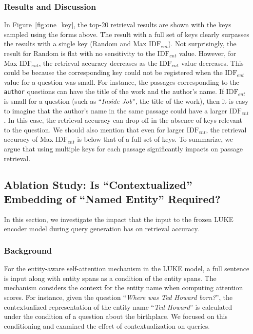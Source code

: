 \documentclass[letterpaper]{article} \usepackage{aaai23}  \usepackage{times}  \usepackage{helvet}  \usepackage{courier}  \usepackage[hyphens]{url}  \usepackage{graphicx} \urlstyle{rm} \def\UrlFont{\rm}  \usepackage{natbib}  \usepackage{caption} \frenchspacing  \setlength{\pdfpagewidth}{8.5in}  \setlength{\pdfpageheight}{11in}  \usepackage{algorithm}
\begin{document}
\subsubsection{Results and Discussion}
In Figure~\ref{fig:one_key}, the top-20 retrieval results are shown with the keys sampled using the forms above.
The result with a full set of keys clearly surpasses the results with a single key (Random and Max $\mathrm{IDF}_{ent}$).
Not surprisingly, the result for Random is flat with no sensitivity to the $\mathrm{IDF}_{ent}$ value.
However, for Max $\mathrm{IDF}_{ent}$, the retrieval accuracy decreases as the $\mathrm{IDF}_{ent}$ value decreases.
This could be because the corresponding key could not be registered when the $\mathrm{IDF}_{ent}$ value for a question was small.
For instance, the passages corresponding to the \texttt{\small author} questions can have the title of the work and the author's name.
If $\mathrm{IDF}_{ent}$ is small for a question (such as ``\textit{Inside Job}'', the title of the work), then it is easy to imagine that the author's name in the same passage could have a larger $\mathrm{IDF}_{ent}$.
In this case, the retrieval accuracy can drop off in the absence of keys relevant to the question.
We should also mention that even for larger $\mathrm{IDF}_{ent}$, the retrieval accuracy of Max $\mathrm{IDF}_{ent}$ is below that of a full set of keys.
To summarize, we argue that using multiple keys for each passage significantly impacts on passage retrieval.


\subsection{Ablation Study: Is ``Contextualized'' Embedding of ``Named Entity'' Required?}\label{sec:ablation_contextualized_embedding}
In this section, we investigate the impact that the input to the frozen LUKE encoder model during query generation has on retrieval accuracy.


\subsubsection{Background}
For the entity-aware self-attention mechanism in the LUKE model, a full sentence is input along with entity spans as a condition of the entity spans.
The mechanism considers the context for the entity name when computing attention scores.
For instance, given the question ``\textit{Where was Ted Howard born?}'', the contextualized representation of the entity name ``\textit{Ted Howard}'' is calculated under the condition of a question about the birthplace.
We focused on this conditioning and examined the effect of contextualization on queries.
\end{document}
